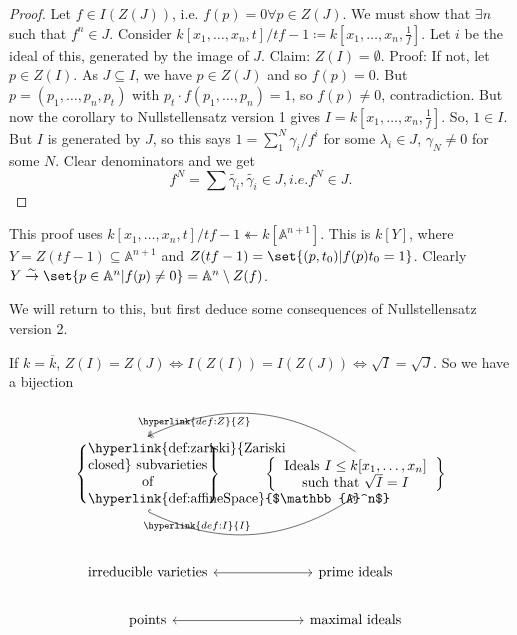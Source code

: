 \documentclass{article}
\newcommand{\A}{\mathbb{A}}
\begin{document}
\color{gray}
\begin{proof}
    Let $f \in I(Z(J))$, i.e. $f(p) = 0 \forall p \in Z(J)$. We must show that $\exists n$ such that $f^n \in J$.
    Consider $k[x_1, \dotsc, x_n, t]/tf-1 \coloneqq k[x_1, \dotsc, x_n, \frac{1}{f}]$.
    Let $i$ be the ideal of this, generated by the image of $J$.
    Claim: $Z(I) = \emptyset$. Proof: If not, let $p \in Z(I)$. As $J \subseteq I$, we have $p \in Z(J)$ and so $f(p) = 0$. But $p=(p_1, \dotsc, p_n, p_t)$ with $p_t \cdot f(p_1, \dotsc, p_n) = 1$, so $f(p) \neq 0$, contradiction.
    But now the corollary to Nullstellensatz version 1 gives $I=k[x_1, \dotsc, x_n, \frac{1}{f}]$. So, $1 \in I$. But $I$ is generated by $J$, so this says $1 = \sum_1^N \gamma_i/f^i$ for some $\lambda_i \in J$, $\gamma_N \neq 0$ for some $N$.
    Clear denominators and we get
    \begin{equation*}
        f^N = \sum \tilde{\gamma_i}, \tilde{\gamma_i} \in J, i.e. f^N \in J.
    \end{equation*}
\end{proof}
\begin{remark}
    This proof uses $k[x_1, \dotsc, x_n, t]/tf-1 \twoheadleftarrow k[\A^{n+1}]$. This is $k[Y]$, where $Y = Z(tf-1) \subseteq \A^{n+1}$ and $Z(tf-1) = \set{(p, t_0) | f(p) t_0 = 1}$.
    Clearly $Y \overset{\sim}{\rightarrow} \set{p \in \A^n | f(p) \neq 0} = \A^n \setminus Z(f)$.
\end{remark}
\color{black}
We will return to this, but first deduce some consequences of Nullstellensatz version 2.
\begin{cor}
    If $k = \overline{k}$, $Z(I) = Z(J) \iff I(Z(I)) = I(Z(J)) \iff \sqrt{I} = \sqrt{J}$.
    So we have a bijection
    \begin{equation*}
        \begin{tikzcd}
            \left\{\parbox{3cm}{\centering \hyperlink{def:zariski}{Zariski closed} subvarieties of \hyperlink{def:affineSpace}{$\A^n$}}\right\}
            \ar[r, bend right, hookrightarrow, "\hyperlink{def:I}{I}", start anchor=south, end anchor=south]&
            \left\{\parbox{4cm}{\centering Ideals $I \leq k[x_1, \dotsc, x_n]$ such that $\sqrt{I}=I$}\right\}
            \ar[l, bend right, two heads, "\hyperlink{def:Z}{Z}", start anchor=north, end anchor=north] \\ \\
            \text{irreducible varieties} \ar[r, leftrightarrow] & \text{prime ideals} \\
            \text{points} \rar[leftrightarrow] & \text{maximal ideals} \\
        \end{tikzcd}
    \end{equation*}
\end{cor}
\end{document}
